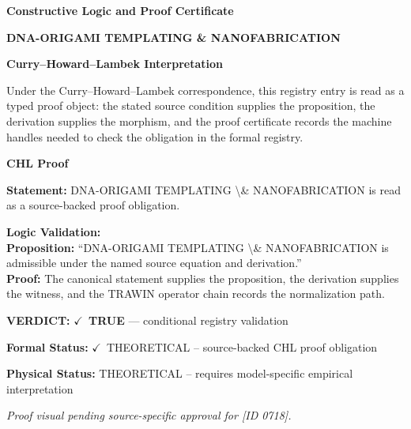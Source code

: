 \clearpage
\begingroup\tzpsupportsetup
\noindent\textbf{\fontsize{10.8pt}{12.8pt}\selectfont [ID 0718] Constructive Logic and Proof Certificate}\par
\noindent\textbf{\fontsize{10pt}{12pt}\selectfont DNA-ORIGAMI TEMPLATING \& NANOFABRICATION}\par
\vspace{0.45em}
\begingroup
\footnotesize
\setlength{\parskip}{0.22em}
\setlength{\parindent}{0pt}
\noindent\textbf{Curry--Howard--Lambek Interpretation}\par
Under the Curry--Howard--Lambek correspondence, this registry entry is read as a typed proof
object: the stated source condition supplies the proposition, the derivation supplies the
morphism, and the proof certificate records the machine handles needed to check the obligation
in the formal registry.

\vspace{0.45em}
\noindent\textbf{CHL Proof}\par
\textbf{Statement:} DNA-ORIGAMI TEMPLATING \textbackslash{}\& NANOFABRICATION is read as a source-backed proof obligation.

\textbf{Logic Validation:}\\
\textbf{Proposition:} ``DNA-ORIGAMI TEMPLATING \textbackslash{}\& NANOFABRICATION is admissible under the named source equation and derivation.''\\
\textbf{Proof:} The canonical statement supplies the proposition, the derivation supplies the witness, and the TRAWIN operator chain records the normalization path.

\textbf{VERDICT:} \ensuremath{\checkmark}\ \textbf{TRUE} --- conditional registry validation

\textbf{Formal Status:} \ensuremath{\checkmark}\ THEORETICAL -- source-backed CHL proof obligation

\textbf{Physical Status:} THEORETICAL -- requires model-specific empirical interpretation
\par\vspace{0.45em}
\par
\vfill
\begingroup\footnotesize\itshape
Proof visual pending source-specific approval for [ID 0718].
\par\endgroup
\vfill
\endgroup
\endgroup
